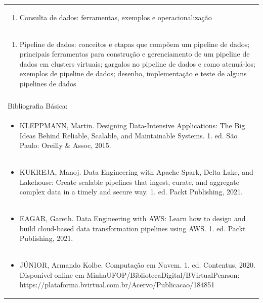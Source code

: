 \documentclass[11pt]{article}
\begin{document}
\begin{center}
\begin{longtable}{|p{4cm}|p{4cm}|p{4cm}|p{4cm}|}
\multicolumn{4}{|p{\dimexpr 16cm + 6\tabcolsep\relax}|}{\begin{enumerate}[start=10]\item Consulta de dados: ferramentas, exemplos e operacionalização\end{enumerate}}\\
\multicolumn{4}{|p{\dimexpr 16cm + 6\tabcolsep\relax}|}{\begin{enumerate}[start=11]\item Pipeline de dados: conceitos e etapas que compõem um pipeline de dados; principais ferramentas para construção e gerenciamento de um pipeline de dados em clusters virtuais; gargalos no pipeline de dados e como atenuá-los; exemplos de pipeline de dados; desenho, implementação e teste de alguns pipelines de dados\end{enumerate}}\\
\multicolumn{4}{|p{\dimexpr 16cm + 6\tabcolsep\relax}|}{}\\
\hline
\multicolumn{4}{|p{16cm}|}{Bibliografia Básica:}\\*
\multicolumn{4}{|p{\dimexpr 16cm + 6\tabcolsep\relax}|}{\begin{itemize}\item KLEPPMANN, Martin. Designing Data-Intensive Applications: The Big Ideas Behind Reliable, Scalable, and Maintainable Systems. 1. ed. São Paulo: Oreilly \& Assoc, 2015.\end{itemize}}\\
\multicolumn{4}{|p{\dimexpr 16cm + 6\tabcolsep\relax}|}{\begin{itemize}\item KUKREJA, Manoj. Data Engineering with Apache Spark, Delta Lake, and Lakehouse: Create scalable pipelines that ingest, curate, and aggregate complex data in a timely and secure way. 1. ed. Packt Publishing, 2021.\end{itemize}}\\
\multicolumn{4}{|p{\dimexpr 16cm + 6\tabcolsep\relax}|}{\begin{itemize}\item EAGAR, Gareth. Data Engineering with AWS: Learn how to design and build cloud-based data transformation pipelines using AWS. 1. ed. Packt Publishing, 2021.\end{itemize}}\\
\multicolumn{4}{|p{\dimexpr 16cm + 6\tabcolsep\relax}|}{\begin{itemize}\item JÚNIOR, Armando Kolbe. Computação em Nuvem. 1. ed. Contentus, 2020. Disponível online em MinhaUFOP/BibliotecaDigital/BVirtualPearson: https://plataforma.bvirtual.com.br/Acervo/Publicacao/184851\end{itemize}}\\

\end{longtable}
\end{center}
\end{document}
